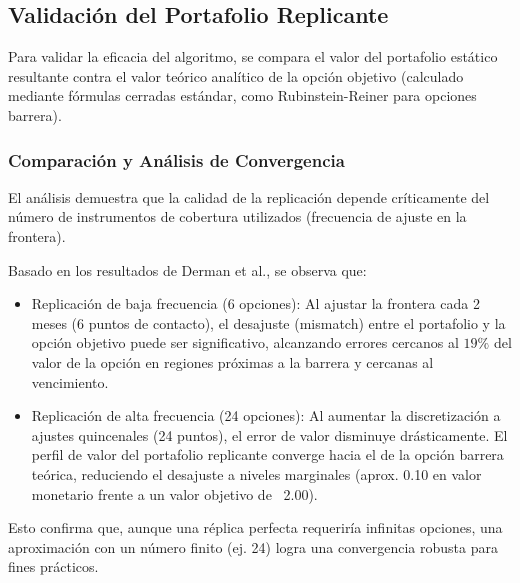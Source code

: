 \subsection{Validación del Portafolio Replicante}


Para validar la eficacia del algoritmo, se compara el valor del portafolio estático resultante contra el valor teórico analítico de la opción objetivo (calculado mediante fórmulas cerradas estándar, como Rubinstein-Reiner para opciones barrera).

\subsubsection*{Comparación y Análisis de Convergencia} 



El análisis demuestra que la calidad de la replicación depende críticamente del número de instrumentos de cobertura utilizados (frecuencia de ajuste en la frontera).

Basado en los resultados de Derman et al., se observa que: 

\begin{itemize} 
  \item Replicación de baja frecuencia (6 opciones): Al ajustar la frontera cada 2 meses (6 puntos de contacto), el desajuste (mismatch) entre el portafolio y la opción objetivo puede ser significativo, alcanzando errores cercanos al $19\%$ del valor de la opción en regiones próximas a la barrera y cercanas al vencimiento. 
  
  \item Replicación de alta frecuencia (24 opciones): Al aumentar la discretización a ajustes quincenales (24 puntos), el error de valor disminuye drásticamente. El perfil de valor del portafolio replicante converge hacia el de la opción barrera teórica, reduciendo el desajuste a niveles marginales (aprox. 0.10 en valor monetario frente a un valor objetivo de ~2.00). 
\end{itemize}

Esto confirma que, aunque una réplica perfecta requeriría infinitas opciones, una aproximación con un número finito (ej. 24) logra una convergencia robusta para fines prácticos.

